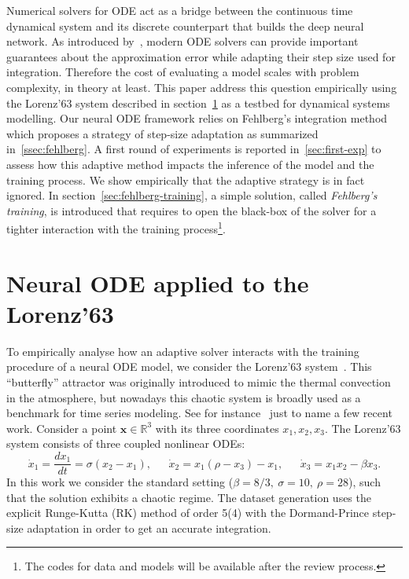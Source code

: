 \documentclass{article}
\newcommand{\R}{\ensuremath{\mathbb{R}}}
\newcommand{\x}{\ensuremath{\mathbf{x}}} %
\begin{document}
Numerical solvers for ODE act as a bridge between the continuous time
dynamical system and its discrete counterpart that builds the deep
neural network. As introduced by~\cite{Chen18NODE}, modern ODE solvers
can provide important guarantees about the approximation error while
adapting their step size used for integration. Therefore the cost of
evaluating a model scales with problem complexity, in theory at
least. This paper address this question empirically using the
Lorenz'63 system described in section~\ref{sec:node} as a testbed for
dynamical systems modelling. Our neural ODE framework relies on
Fehlberg's integration method which proposes a strategy of step-size
adaptation as summarized in~\ref {ssec:fehlberg}. A first round of
experiments is reported in~\ref{sec:first-exp} to assess how this
adaptive method impacts the inference of the model and the training
process. We show empirically that the adaptive strategy is in fact
ignored.  In section~\ref{sec:fehlberg-training}, a simple solution,
called \textit{Fehlberg's training}, is introduced that requires to
open the black-box of the solver for a tighter interaction with the
training process\footnote{The codes for data and models will be
  available after the review process.}.
 
\section{Neural ODE applied to the Lorenz'63}
\label{sec:node}

To empirically analyse how an adaptive solver interacts with the
training procedure of a neural ODE model, we consider the
Lorenz'63 system~\cite{Lorenz63}. This ``butterfly'' attractor was
originally introduced to mimic the thermal convection in the
atmosphere, but nowadays this chaotic system is broadly used
as a benchmark for time series modeling. See for
instance~\cite{Nassar18Tree,Champion19Data,Greydanus19Hamlitonian,Dubois20Data,Gilpin21Chaos}
just to name a few recent work. Consider a point $\x \in \R^3$ with its three
coordinates $x_1, x_2, x_3$. The Lorenz'63 system consists of three
coupled nonlinear ODEs:
\begin{equation}
  \label{eq:lorenz}
  \dot{x}_1 = \frac{dx_1}{dt} = \sigma (x_2 - x_1),\phantom{5ex}
  \dot{x}_2 = x_1(\rho - x_3) - x_1,\phantom{5ex}
  \dot{x}_3 = x_1x_2 - \beta x_3.
\end{equation}
In this work we consider the standard setting
($\beta = 8/3,\ \sigma = 10,\ \rho = 28$), such that the solution
exhibits a chaotic regime. The dataset generation uses the explicit
Runge-Kutta (RK) method of order 5(4) with the Dormand-Prince
step-size adaptation in order to get an accurate integration.
\end{document}
